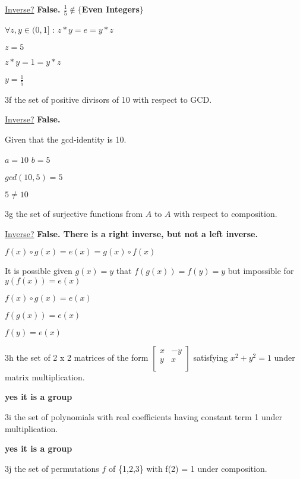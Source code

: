 \underline{Inverse?} \textbf{False. $\frac{1}{5} \notin \{$Even Integers$\}$}

$\forall z,y \in (0,1]$ : $z * y = e = y * z$

$z=5$

$z * y = 1 = y * z$

$y = \frac{1}{5}$

\begin{question}{3f}
the set of positive divisors of 10 with respect to GCD.
\end{question}

\underline{Inverse?} \textbf{False.}

Given that the gcd-identity is 10.

$a=10$ $b=5$

$gcd(10,5) = 5$ 

$5 \neq 10$

\begin{question}{3g}
the set of surjective functions from $A$ to $A$ with respect to composition.
\end{question}

\underline{Inverse?} \textbf{False. There is a right inverse, but not a left inverse.}

$f(x) \circ g(x) = e(x) = g(x) \circ f(x)$

It is possible given $g(x) = y$ that $f(g(x)) = f(y) = y$ but impossible for $y(f(x)) = e(x)$

$f(x) \circ g(x) = e(x)$

$f(g(x)) = e(x)$

$f(y) = e(x)$

\begin{question}{3h}
the set of 2 x 2 matrices of the form $\begin{bmatrix}
  x & -y \\
  y & x  \\
 \end{bmatrix}$ satisfying $x^2 + y^2 = 1$ under matrix multiplication.

\end{question}

\textbf{yes it is a group}

\begin{question}{3i}
the set of polynomials with real coefficients having constant term 1 under multiplication.
\end{question}

\textbf{yes it is a group}

\begin{question}{3j}
the set of permutations $f$ of \{1,2,3\} with f(2) = 1 under composition.
\end{question}

